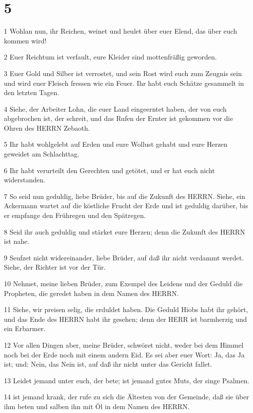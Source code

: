 \chapter{5}

\par 1 Wohlan nun, ihr Reichen, weinet und heulet über euer Elend, das über euch kommen wird!
\par 2 Euer Reichtum ist verfault, eure Kleider sind mottenfräßig geworden.
\par 3 Euer Gold und Silber ist verrostet, und sein Rost wird euch zum Zeugnis sein und wird euer Fleisch fressen wie ein Feuer. Ihr habt euch Schätze gesammelt in den letzten Tagen.
\par 4 Siehe, der Arbeiter Lohn, die euer Land eingeerntet haben, der von euch abgebrochen ist, der schreit, und das Rufen der Ernter ist gekommen vor die Ohren des HERRN Zebaoth.
\par 5 Ihr habt wohlgelebt auf Erden und eure Wollust gehabt und eure Herzen geweidet am Schlachttag.
\par 6 Ihr habt verurteilt den Gerechten und getötet, und er hat euch nicht widerstanden.
\par 7 So seid nun geduldig, liebe Brüder, bis auf die Zukunft des HERRN. Siehe, ein Ackermann wartet auf die köstliche Frucht der Erde und ist geduldig darüber, bis er empfange den Frühregen und den Spätregen.
\par 8 Seid ihr auch geduldig und stärket eure Herzen; denn die Zukunft des HERRN ist nahe.
\par 9 Seufzet nicht widereinander, liebe Brüder, auf daß ihr nicht verdammt werdet. Siehe, der Richter ist vor der Tür.
\par 10 Nehmet, meine lieben Brüder, zum Exempel des Leidens und der Geduld die Propheten, die geredet haben in dem Namen des HERRN.
\par 11 Siehe, wir preisen selig, die erduldet haben. Die Geduld Hiobs habt ihr gehört, und das Ende des HERRN habt ihr gesehen; denn der HERR ist barmherzig und ein Erbarmer.
\par 12 Vor allen Dingen aber, meine Brüder, schwöret nicht, weder bei dem Himmel noch bei der Erde noch mit einem andern Eid. Es sei aber euer Wort: Ja, das Ja ist; und: Nein, das Nein ist, auf daß ihr nicht unter das Gericht fallet.
\par 13 Leidet jemand unter euch, der bete; ist jemand gutes Muts, der singe Psalmen.
\par 14 ist jemand krank, der rufe zu sich die Ältesten von der Gemeinde, daß sie über ihm beten und salben ihn mit Öl in dem Namen des HERRN.
